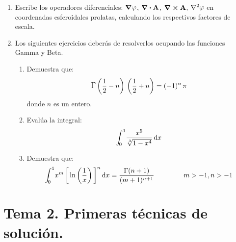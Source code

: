 \documentclass[12pt]{article}
\def\scaleint#1{\vcenter{\hbox{\scaleto[3ex]{\displaystyle\int}{#1}}}}
\def\bs{\mkern-12mu}
\begin{document}
\begin{enumerate}
\item Escribe los operadores diferenciales: $\grad{\varphi}$, $\div{\vb{A}}$, $\curl{\vb{A}}$, $\laplacian{\varphi}$ en coordenadas esferoidales prolatas, calculando los respectivos factores de escala.
\item Los siguientes ejercicios deberás de resolverlos ocupando las funciones Gamma y Beta.
\begin{enumerate}
\item Demuestra que:
\begin{align*}
\mathlarger{\Gamma} \left( \dfrac{1}{2} - n \right) \, \left( \dfrac{1}{2} + n \right) = (-1)^{n} \, \pi
\end{align*}
donde $n$ es un entero.
\item \label{ejercicio_09} Evalúa la integral:
\begin{align*}
\scaleint{5ex}_{\bs 0}^{1} \dfrac{x^{5}}{\sqrt[3]{1 - x^{4}}} \dd{x}
\end{align*}
\item \label{ejercicio_10} Demuestra que:
\begin{align*}
\scaleint{5ex}_{\bs 0}^{1} x^{m} \, \bigg[ \ln \left( \dfrac{1}{x} \right) \bigg]^{n} \dd{x} = \dfrac{\Gamma(n + 1)}{(m + 1)^{n+1}} \hspace{1.5cm} m > -1, n > -1
\end{align*}
\end{enumerate}
\end{enumerate}

\section{Tema 2. Primeras técnicas de solución.}
\end{document}
